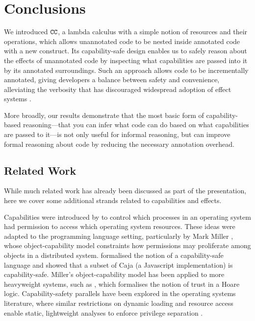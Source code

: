 \vspace{-0.6cm}
\section{Conclusions}
\vspace{-0.4cm}

We introduced $\mathtt{CC}$, a lambda calculus with a simple notion of resources and
their operations, which allows unannotated code to be nested inside annotated code
with a new  construct. Its capability-safe design enables us to safely
reason about the effects of unannotated code by inspecting what capabilities are
passed into it by its annotated surroundings. Such an approach allows code to be
incrementally annotated, giving developers a balance between safety and convenience,
alleviating the verbosity that has discouraged widespread adoption of effect systems
\cite{rytz12}.

More broadly, our results demonstrate that the most basic form of capability-based reasoning---that you can infer what code can do based on what capabilities are passed to it---is not only useful for informal reasoning, but can improve formal reasoning about code by reducing the necessary annotation overhead.

\vspace{-0.6cm}
\subsection{Related Work}
\vspace{-0.4cm}

While much related work has already been discussed as part of the presentation, here we cover some additional strands related to capabilities and effects.

Capabilities were introduced by \cite{dennis66} to control which processes in an operating system had permission to access which operating system resources.
These ideas were adapted to the programming language setting, particularly by
Mark Miller \cite{miller06}, whose object-capability model constraints how permissions
may proliferate among objects in a distributed system. \cite{maffeis10} formalised
the notion of a capability-safe language and showed that a subset of Caja (a
Javascript implementation) is capability-safe. Miller's object-capability model has been
applied to more heavyweight systems, such as \cite{drossopoulou07}, which
formalises the notion of trust in a Hoare logic. Capability-safety parallels have been
explored in the operating systems literature, where similar restrictions on dynamic
 loading and resource access \cite{hunt07} enable static, lightweight analyses to
  enforce privilege separation \cite{madhavapeddy13}.

